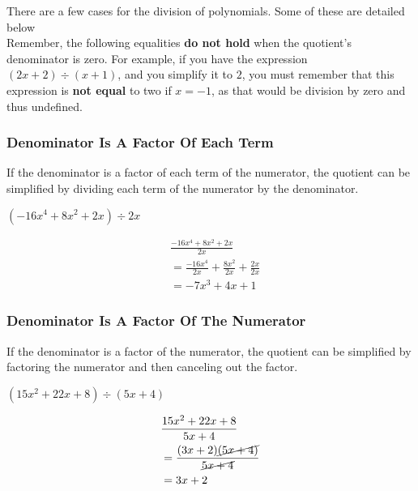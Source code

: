 \documentclass[english,seminar]{lecture}
\begin{document}

There are a few cases for the division of polynomials.
Some of these are detailed below\\

Remember, the following equalities \textbf{do not hold} when the quotient's denominator is zero.
For example, if you have the expression $(2x + 2) \div (x + 1)$, and you simplify it to $2$, you must remember that this expression is \textbf{not equal} to two if $x = -1$, as that would be division by zero and thus undefined.

\subsubsection{Denominator Is A Factor Of Each Term}

If the denominator is a factor of each term of the numerator,
the quotient can be simplified by dividing each term of the numerator by the denominator.

\begin{example}[Simplify]
	$(-16x^4 + 8x^2 + 2x) \div 2x$


	\begin{align*}
		&\frac{-16x^4 + 8x^2 + 2x}{2x}\\
		&= \frac{-16x^4}{2x} + \frac{8x^2}{2x} + \frac{2x}{2x}\\
		&= -7x^3 + 4x + 1
	\end{align*}
\end{example}

\subsubsection{Denominator Is A Factor Of The Numerator}

If the denominator is a factor of the numerator, the quotient can be simplified
by factoring the numerator and then canceling out the factor.

\begin{example}[Simplify]
	$(15x^2 + 22x + 8) \div (5x + 4)$


	\begin{align*}
	&\frac{15x^2 + 22x + 8}{5x + 4}	\\
	&= \frac{(3x + 2)\cancel{(5x + 4)}}{\cancel{5x + 4}}\\
	&= 3x + 2
	\end{align*}
\end{example}
\end{document}
